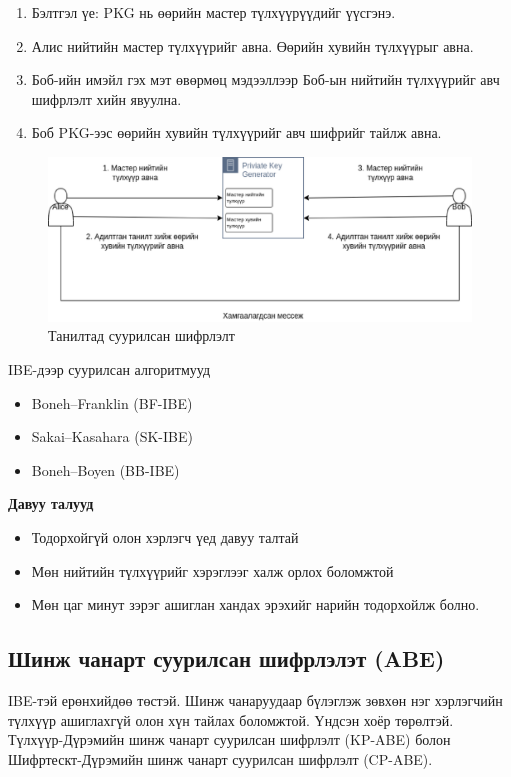 \begin{enumerate}
    \item Бэлтгэл үе: PKG нь өөрийн мастер түлхүүрүүдийг үүсгэнэ.
    \item Алис нийтийн мастер түлхүүрийг авна. Өөрийн хувийн түлхүүрыг авна.
    \item Боб-ийн имэйл гэх мэт өвөрмөц мэдээллээр Боб-ын нийтийн түлхүүрийг авч шифрлэлт хийн явуулна.
    \item Боб PKG-ээс өөрийн хувийн түлхүүрийг авч шифрийг тайлж авна.
\end{enumerate}


\begin{figure}[ht]
\centering
\includegraphics[scale=0.6]{Figures/IBE.eps}
\caption[IBE]{Танилтад суурилсан шифрлэлт}
\label{fig:IBE}
\end{figure}

IBE-дээр суурилсан алгоритмууд

\begin{itemize}
    \item Boneh–Franklin (BF-IBE)
    \item Sakai–Kasahara (SK-IBE)
    \item Boneh–Boyen (BB-IBE)
\end{itemize}

\textbf{Давуу талууд}
\begin{itemize}
    \item Тодорхойгүй олон хэрлэгч үед давуу талтай
    \item Мөн нийтийн түлхүүрийг хэрэглээг халж орлох боломжтой
    \item Мөн цаг минут зэрэг ашиглан хандах эрэхийг нарийн тодорхойлж болно. 
\end{itemize}
\subsection*{Шинж чанарт суурилсан шифрлэлэт (ABE)}
IBE-тэй ерөнхийдөө төстэй. Шинж чанаруудаар бүлэглэж зөвхөн нэг хэрлэгчийн түлхүүр ашиглахгүй олон хүн тайлах боломжтой.
Үндсэн хоёр төрөлтэй. Түлхүүр-Дүрэмийн шинж чанарт суурилсан шифрлэлт (KP-ABE) болон Шифртескт-Дүрэмийн шинж чанарт суурилсан шифрлэлт (CP-ABE).

